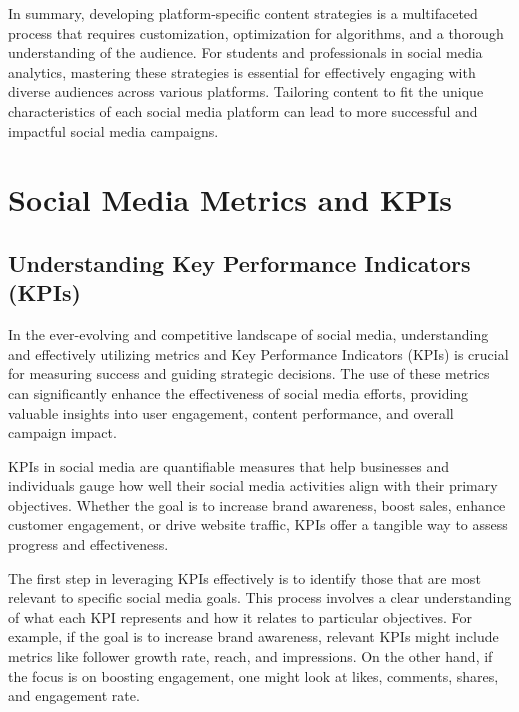 \documentclass[
]{book}
\begin{document}
In summary, developing platform-specific content strategies is a multifaceted process that requires customization, optimization for algorithms, and a thorough understanding of the audience. For students and professionals in social media analytics, mastering these strategies is essential for effectively engaging with diverse audiences across various platforms. Tailoring content to fit the unique characteristics of each social media platform can lead to more successful and impactful social media campaigns.

\hypertarget{social-media-metrics-and-kpis}{%
\chapter{Social Media Metrics and KPIs}\label{social-media-metrics-and-kpis}}

\hypertarget{understanding-key-performance-indicators-kpis}{%
\section*{Understanding Key Performance Indicators (KPIs)}\label{understanding-key-performance-indicators-kpis}}

In the ever-evolving and competitive landscape of social media, understanding and effectively utilizing metrics and Key Performance Indicators (KPIs) is crucial for measuring success and guiding strategic decisions. The use of these metrics can significantly enhance the effectiveness of social media efforts, providing valuable insights into user engagement, content performance, and overall campaign impact.

KPIs in social media are quantifiable measures that help businesses and individuals gauge how well their social media activities align with their primary objectives. Whether the goal is to increase brand awareness, boost sales, enhance customer engagement, or drive website traffic, KPIs offer a tangible way to assess progress and effectiveness.

The first step in leveraging KPIs effectively is to identify those that are most relevant to specific social media goals. This process involves a clear understanding of what each KPI represents and how it relates to particular objectives. For example, if the goal is to increase brand awareness, relevant KPIs might include metrics like follower growth rate, reach, and impressions. On the other hand, if the focus is on boosting engagement, one might look at likes, comments, shares, and engagement rate.
\end{document}
